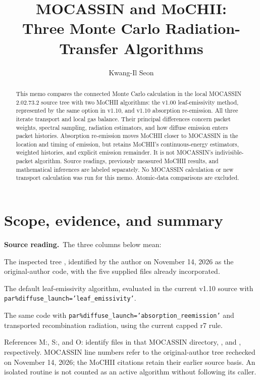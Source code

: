 \documentclass[english,a4paper]{my_memo}
\newcommand{\code}[1]{\texttt{#1}}
\newcommand{\Source}{\noindent\textbf{Source reading.}\ }
\begin{document}
\title{MOCASSIN and MoCHII:\\Three Monte Carlo Radiation-Transfer Algorithms}
\author{Kwang-Il Seon}
\date{\docmoddate}
\maketitle
\begin{abstract}
This memo compares the connected Monte Carlo calculation in the local
MOCASSIN 2.02.73.2 source tree with two MoCHII algorithms: the v1.00
leaf-emissivity method, represented by the same option in v1.10, and
v1.10 absorption re-emission. All three iterate transport and local gas
balance. Their principal differences concern packet weights, spectral
sampling, radiation estimators, and how diffuse emission enters packet
histories. Absorption re-emission moves MoCHII closer to MOCASSIN in the
location and timing of emission, but retains MoCHII's continuous-energy
estimators, weighted histories, and explicit emission remainder. It is
not MOCASSIN's indivisible-packet algorithm. Source readings, previously
measured MoCHII results, and mathematical inferences are labeled
separately. No MOCASSIN calculation or new transport calculation was run
for this memo. Atomic-data comparisons are excluded.
\end{abstract}
\tableofcontents

\section{Scope, evidence, and summary}
\label{sec:scope}
\Source The three columns below mean:
\begin{description}[leftmargin=2.1em,style=nextline,itemsep=2pt]
\item[A: MOCASSIN] The inspected tree
, identified by the author on November 14, 2026 as the original-author code, with the five supplied  files already incorporated.
\item[B: v1.00 algorithm] The default leaf-emissivity algorithm, evaluated
in the current v1.10 source with
\code{par\%diffuse\_launch}\allowbreak\code{='leaf\_emissivity'}.
\item[C: v1.10 new option] The same code with
\code{par\%diffuse\_launch}\allowbreak\code{='absorption\_reemission'} and transported
recombination radiation, using the current capped r7 rule.
\end{description}
References \textsf{M:}, \textsf{S:}, and \textsf{O:} identify files in that
MOCASSIN directory, , and
, respectively. MOCASSIN line numbers refer to the original-author tree rechecked on
November 14, 2026; the MoCHII citations retain their earlier source basis. An isolated routine is not counted as an active
algorithm without following its caller.
\end{document}
